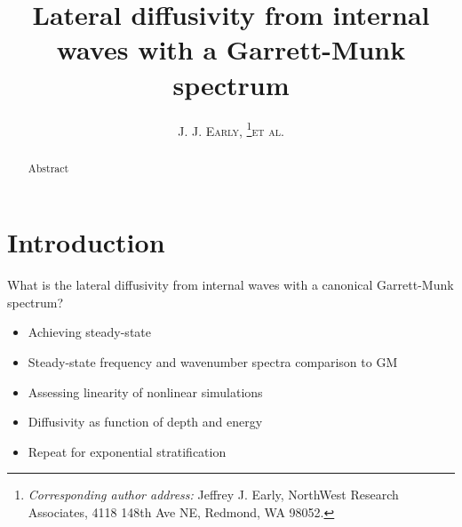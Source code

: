 \documentclass[10pt]{article}
\newcommand{\myabstract}{Abstract}
\begin{document}
%
%
\title{\textbf{\large{Lateral diffusivity from internal waves with a Garrett-Munk spectrum}}}
%
%
\author{\textsc{J. J. Early,}
				\thanks{\textit{Corresponding author address:} 
				Jeffrey J. Early, NorthWest Research Associates, 
				4118 148th Ave NE, Redmond, WA 98052. 
				}\quad\textsc{et al.}
}
%
{
\twocolumn[
\begin{@twocolumnfalse}
\amstitle

\begin{center}
\begin{minipage}{13.0cm}
\begin{abstract}
	\myabstract
	\newline
	\begin{center}
		\rule{38mm}{0.2mm}
	\end{center}
\end{abstract}
\end{minipage}
\end{center}
\end{@twocolumnfalse}
]
}
{
\amstitle
\begin{abstract}
\myabstract
\end{abstract}
\newpage
}


%
\section{Introduction}
%
What is the lateral diffusivity from internal waves with a canonical Garrett-Munk spectrum?
\begin{itemize}
\item Achieving steady-state
\item Steady-state frequency and wavenumber spectra comparison to GM
\item Assessing linearity of nonlinear simulations
\item Diffusivity as function of depth and energy
\item Repeat for exponential stratification
\end{itemize}
\end{document}

